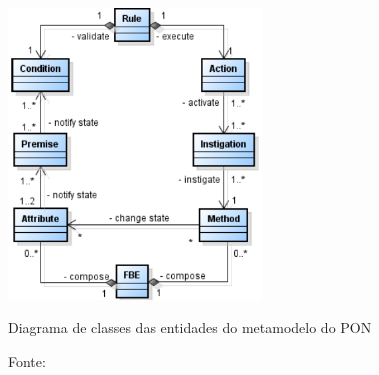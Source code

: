 \begin{figure}[!htb]
  \centering
  \includegraphics[width=0.6\textwidth]{../figures/metamodelo_pon.png}
  \caption{Diagrama de classes das entidades do metamodelo do PON}
  \caption*{Fonte: }
  \label{fig:nop_class}
\end{figure}

